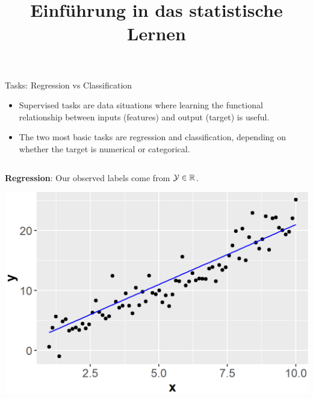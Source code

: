 \documentclass[11pt,compress,t,notes=noshow, xcolor=table]{beamer}
\title{Einführung in das statistische Lernen}
\institute{\href{https://compstat-lmu.github.io/lecture_i2ml/}{compstat-lmu.github.io/lecture\_i2ml}}
\date{}
\begin{document}









\begin{vbframe}{Tasks: Regression vs Classification}

\begin{itemize}
    \item Supervised tasks are data situations where learning the functional
        relationship between inputs (features) and output (target) is
        useful.

    \item The two most basic tasks are
        regression and classification, depending on whether the
        target is numerical or categorical.
\end{itemize}

\lz

\begin{columns}
\begin{column}{0.5\textwidth}
\textbf{Regression}: Our observed labels come from $\mathcal{Y} \in \mathbb{R}$.

  \begin{center}
    \includegraphics[width=\textwidth]{figure/ml-basics-supervised-regression-task.png}
  \end{center}
\end{column}


\end{columns}
\end{vbframe}
\end{document}
